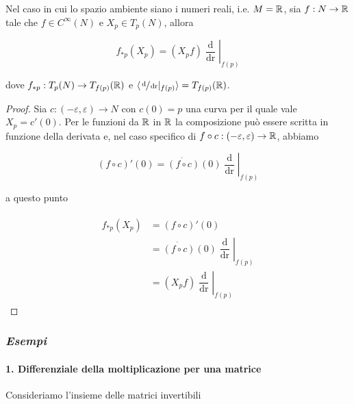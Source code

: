 \begin{corollary}
	Nel caso in cui lo spazio ambiente siano i numeri reali, i.e. $ M = \mathbb{R} $, sia $ f : N \to \mathbb{R} $ tale che $ f \in C^{\infty}(N) $ e $ X_{p} \in T_{p}(N) $, allora
	
	\begin{equation}
		f_{*p}(X_{p}) = (X_{p} f) \left. \dfrac{\operatorname{d}}{\operatorname{dr}} \right|_{f(p)}
	\end{equation}

	dove $ f_{*p} : T_{p}(N) \to T_{f(p)}(\mathbb{R}) $ e $ \langle \sfrac{\operatorname{d}}{\operatorname{dr}} |_{f(p)} \rangle = T_{f(p)}(\mathbb{R}) $.
\end{corollary}

\begin{proof}
	Sia $ c : (-\varepsilon,\varepsilon) \to N $ con $ c(0) = p $ una curva per il quale vale $ X_{p} = c'(0) $. Per le funzioni da $ \mathbb{R} $ in $ \mathbb{R} $ la composizione può essere scritta in funzione della derivata e, nel caso specifico di $ f \circ c : (-\varepsilon,\varepsilon) \to \mathbb{R} $, abbiamo
	
	\begin{equation}
		(f \circ c)'(0) = \dot{(f \circ c)}(0) \left. \dfrac{\operatorname{d}}{\operatorname{dr}} \right|_{f(p)}
	\end{equation}

	a questo punto
	
	\begin{align}
		\begin{split}
			f_{*p}(X_{p}) &= (f \circ c)' (0)\\
			&= \dot{(f \circ c)}(0) \left. \dfrac{\operatorname{d}}{\operatorname{dr}} \right|_{f(p)}\\
			&= (X_{p} f) \left. \dfrac{\operatorname{d}}{\operatorname{dr}} \right|_{f(p)}
		\end{split}
	\end{align}
\end{proof}

\subsubsection{\textit{Esempi}}

\paragraph{1. Differenziale della moltiplicazione per una matrice}\label{trasl-diff}

Consideriamo l'insieme delle matrici invertibili

